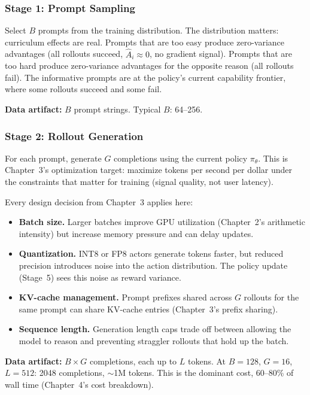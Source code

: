 \subsubsection*{Stage 1: Prompt Sampling}

Select $B$ prompts from the training distribution. The distribution matters: curriculum effects are real. Prompts that are too easy produce zero-variance advantages (all rollouts succeed, $\hat{A}_i \approx 0$, no gradient signal). Prompts that are too hard produce zero-variance advantages for the opposite reason (all rollouts fail). The informative prompts are at the policy's current capability frontier, where some rollouts succeed and some fail.

\textbf{Data artifact:} $B$ prompt strings. Typical $B$: 64--256.

\subsubsection*{Stage 2: Rollout Generation}

For each prompt, generate $G$ completions using the current policy $\pi_\theta$. This is Chapter~3's optimization target: maximize tokens per second per dollar under the constraints that matter for training (signal quality, not user latency).

Every design decision from Chapter~3 applies here:
\begin{itemize}
  \item \textbf{Batch size.} Larger batches improve GPU utilization (Chapter~2's arithmetic intensity) but increase memory pressure and can delay updates.
  \item \textbf{Quantization.} INT8 or FP8 actors generate tokens faster, but reduced precision introduces noise into the action distribution. The policy update (Stage~5) sees this noise as reward variance.
  \item \textbf{KV-cache management.} Prompt prefixes shared across $G$ rollouts for the same prompt can share KV-cache entries (Chapter~3's prefix sharing).
  \item \textbf{Sequence length.} Generation length caps trade off between allowing the model to reason and preventing straggler rollouts that hold up the batch.
\end{itemize}

\textbf{Data artifact:} $B \times G$ completions, each up to $L$ tokens. At $B = 128$, $G = 16$, $L = 512$: 2048 completions, $\sim$1M tokens. This is the dominant cost, 60--80\% of wall time (Chapter~4's cost breakdown).

